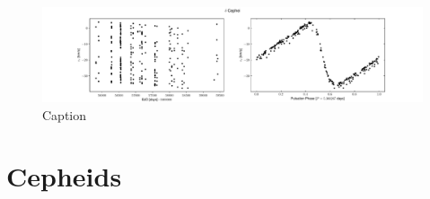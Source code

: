         \begin{figure}[H]
        \centering
        \includegraphics[width=\textwidth]{report/images/chap2_foundations/delcep_rv.pdf}
        \caption{Caption}
        \label{2.2c}
        \end{figure}
    
    \section{Cepheids}
    
